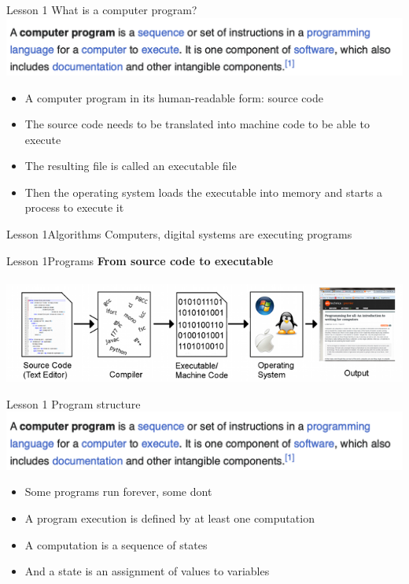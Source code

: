 \documentclass[aspectratio=1610]{beamer}
\begin{document}
\begin{frame}{Lesson 1}{}
{\Huge{What is a computer program?}}
\includegraphics[scale=0.67]{Images/program}

\Large{
\begin{itemize}
    \item A computer program in its human-readable form: source code
    \item The source code needs to be translated into machine code to be able to execute
    \item The resulting file is called an executable file
    \item Then the operating system loads the executable into memory and starts a process to execute it
\end{itemize}}

\end{frame}


\begin{frame}{Lesson 1}{Algorithms}
\Huge Computers, digital systems are executing programs
\end{frame}


\begin{frame}{Lesson 1}{Programs}
\Large
\textbf{From source code to executable}\\~\\ 
\includegraphics[scale=0.65]{Images/CompilationChain}
\end{frame}


\begin{frame}{Lesson 1}{}
{\Huge{Program structure}}
\includegraphics[scale=0.67]{Images/program}

\Large{
\begin{itemize}
    \item Some programs run forever, some dont
    \item A program execution is defined by at least one computation
    \item A computation is a sequence of states
    \item And a state is an assignment of values to variables
\end{itemize}}

\end{frame}
\end{document}
